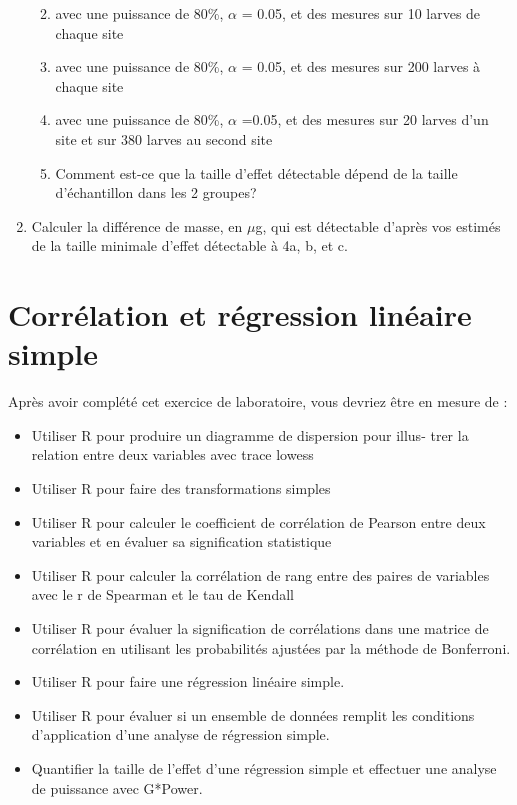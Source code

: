 \documentclass[12pt,]{book}
\makeatletter
\providecommand{\tightlist}{%
  \setlength{\itemsep}{0pt}\setlength{\parskip}{0pt}}
\newenvironment{kframe}{%
\medskip{}
\setlength{\fboxsep}{.8em}
 \def\at@end@of@kframe{}%
 \ifinner\ifhmode%
  \def\at@end@of@kframe{\end{minipage}}%
  \begin{minipage}{\columnwidth}%
 \fi\fi%
 \def\FrameCommand##1{\hskip\@totalleftmargin \hskip-\fboxsep
 \colorbox{shadecolor}{##1}\hskip-\fboxsep
     \hskip-\linewidth \hskip-\@totalleftmargin \hskip\columnwidth}%
 \MakeFramed {\advance\hsize-\width
   \@totalleftmargin\z@ \linewidth\hsize
   \@setminipage}}%
 {\par\unskip\endMakeFramed%
 \at@end@of@kframe}
\newenvironment{rmdblock}[1]
  {
  \begin{itemize}
  \renewcommand{\labelitemi}{
    \raisebox{-.7\height}[0pt][0pt]{
      {\setkeys{Gin}{width=3em,keepaspectratio}\texttt{[image: images/\#1]}}
    }
  }
  \setlength{\fboxsep}{1em}
  \begin{kframe}
  \item
  }
  {
  \end{kframe}
  \end{itemize}
  }
\newenvironment{rmdcode}
  {\begin{rmdblock}{screen}}
  {\end{rmdblock}}
\makeatother
\begin{document}
\begin{rmdcode}
\begin{enumerate}
  \begin{enumerate}
  \def\labelenumii{\alph{enumii})}
  \tightlist
  \item
    avec une puissance de 80\%, \(\alpha\) = 0.05, et des mesures sur 10 larves de chaque site
  \item
    avec une puissance de 80\%, \(\alpha\) = 0.05, et des mesures sur 200 larves à chaque site
  \item
    avec une puissance de 80\%, \(\alpha\) =0.05, et des mesures sur 20 larves d'un site et sur 380 larves au second site
  \item
    Comment est-ce que la taille d'effet détectable dépend de la taille d'échantillon dans les 2 groupes?
  \end{enumerate}
\item
  Calculer la différence de masse, en \(\mu\)g, qui est détectable d'après vos estimés de la taille minimale d'effet détectable à 4a, b, et c.
\end{enumerate}
\end{rmdcode}

\hypertarget{corruxe9lation-et-ruxe9gression-linuxe9aire-simple}{%
\chapter{Corrélation et régression linéaire simple}\label{corruxe9lation-et-ruxe9gression-linuxe9aire-simple}}

Après avoir complété cet exercice de laboratoire, vous devriez être en mesure de :

\begin{itemize}
\tightlist
\item
  Utiliser R pour produire un diagramme de dispersion pour illus-
  trer la relation entre deux variables avec trace lowess
\item
  Utiliser R pour faire des transformations simples
\item
  Utiliser R pour calculer le coefficient de corrélation de Pearson entre deux variables et en évaluer sa signification statistique
\item
  Utiliser R pour calculer la corrélation de rang entre des paires de variables avec le r de Spearman et le tau de Kendall
\item
  Utiliser R pour évaluer la signification de corrélations dans une matrice de corrélation en utilisant les probabilités ajustées par la méthode de Bonferroni.
\item
  Utiliser R pour faire une régression linéaire simple.
\item
  Utiliser R pour évaluer si un ensemble de données remplit les conditions d'application d'une analyse de régression simple.
\item
  Quantifier la taille de l'effet d'une régression simple et effectuer une analyse de puissance avec G*Power.
\end{itemize}
\end{document}
